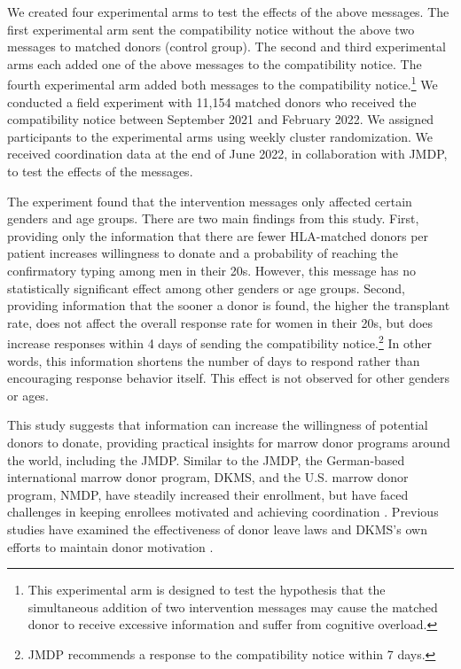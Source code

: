 \documentclass[
]{article}
\begin{document}
We created four experimental arms to test the effects of the above messages. The first experimental arm sent the compatibility notice without the above two messages to matched donors (control group). The second and third experimental arms each added one of the above messages to the compatibility notice. The fourth experimental arm added both messages to the compatibility notice.\footnote{This experimental arm is designed to test the hypothesis that the simultaneous addition of two intervention messages may cause the matched donor to receive excessive information and suffer from cognitive overload.} We conducted a field experiment with 11,154 matched donors who received the compatibility notice between September 2021 and February 2022. We assigned participants to the experimental arms using weekly cluster randomization. We received coordination data at the end of June 2022, in collaboration with JMDP, to test the effects of the messages.

The experiment found that the intervention messages only affected certain genders and age groups. There are two main findings from this study. First, providing only the information that there are fewer HLA-matched donors per patient increases willingness to donate and a probability of reaching the confirmatory typing among men in their 20s. However, this message has no statistically significant effect among other genders or age groups. Second, providing information that the sooner a donor is found, the higher the transplant rate, does not affect the overall response rate for women in their 20s, but does increase responses within 4 days of sending the compatibility notice.\footnote{JMDP recommends a response to the compatibility notice within 7 days.} In other words, this information shortens the number of days to respond rather than encouraging response behavior itself. This effect is not observed for other genders or ages.

This study suggests that information can increase the willingness of potential donors to donate, providing practical insights for marrow donor programs around the world, including the JMDP. Similar to the JMDP, the German-based international marrow donor program, DKMS, and the U.S. marrow donor program, NMDP, have steadily increased their enrollment, but have faced challenges in keeping enrollees motivated and achieving coordination \citep{Switzer1999, Switzer2004, Haylock2022}. Previous studies have examined the effectiveness of donor leave laws \citep{Lacetera2014} and DKMS's own efforts to maintain donor motivation \citep{Haylock2022}.
\end{document}
